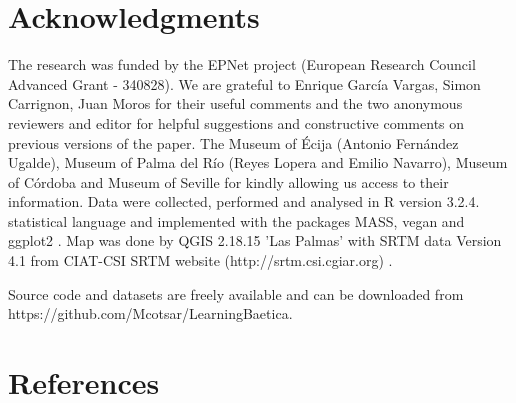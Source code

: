 \documentclass[review]{elsarticle}
\begin{document}
\section{Acknowledgments}

The research was funded by the EPNet project (European Research Council Advanced Grant - 340828). We are grateful to Enrique Garc\'ia Vargas, Simon Carrignon, Juan Moros for their useful comments and the two anonymous reviewers and editor for helpful suggestions and constructive comments on previous versions of the paper. The Museum of \'Ecija (Antonio Fern\'andez Ugalde), Museum of Palma del R\'io (Reyes Lopera and Emilio Navarro), Museum of C\'ordoba and Museum of Seville for kindly allowing us access to their information. Data were collected, performed and analysed in R version 3.2.4. statistical language and implemented with the packages MASS, vegan and ggplot2 \citep{ripley_package_2013,oksanen_vegan_2007,ggplot2:_2016}. Map was done by QGIS 2.18.15 'Las Palmas' with SRTM data Version 4.1 from CIAT-CSI SRTM website (http://srtm.csi.cgiar.org) \citep{SRTM}. 

Source code and datasets are freely available and can be downloaded from https://github.com/Mcotsar/LearningBaetica.  

\section*{References}


\end{document}
